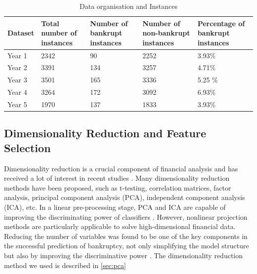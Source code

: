 \begin{table}[h!]
\begin{center}
 \begin{tabular}{|l|p{2cm}|p{3cm}|p{3cm}|p{3cm}|} 
 \hline
 Dataset & Total number of instances & Number of bankrupt instances & Number of non-bankrupt instances & Percentage of bankrupt instances

  \\ [0.5ex] 
 \hline\hline
 
Year 1 & 2342 & 90 & 2252 & 3.93\% \\ \hline
 
Year 2 & 3391 & 134 & 3257 & 4.71\% \\ \hline
 
Year 3 & 3501 & 165 & 3336 & 5.25 \% \\ \hline
 
Year 4 & 3264 & 172 & 3092 & 6.93\% \\ \hline
 
Year 5 & 1970 & 137 & 1833 & 3.93\% \\ \hline

\end{tabular}
\end{center}

    \caption{Data organisation and Instances}
\label{table:Data organization and Instances}
\end{table}

\subsection{Dimensionality Reduction and Feature Selection}

Dimensionality reduction is a crucial component of financial analysis and has received a lot of interest in recent studies \cite{cao2012aggregating}. Many dimensionality reduction methods have been proposed, such as t-testing, correlation matrices, factor analysis, principal component analysis (PCA), independent component analysis (ICA), etc.
In a linear pre-processing stage, PCA and ICA are capable of improving the discriminating power of classifiers \cite{chen2009bankruptcy}. 
However, nonlinear projection methods are particularly applicable to solve high-dimensional financial data. Reducing the number of variables was found to be one of the key components in the successful prediction of bankruptcy, not only simplifying the model structure but also by improving the discriminative power \cite{cao2012aggregating}. The dimensionality reduction method we used is described in \autoref{sec:pca}

